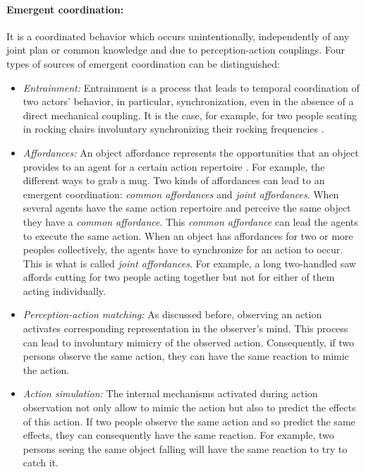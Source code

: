 \documentclass[english,a4paper,11pt,twoside]{StyleThese}
\begin{document}
\paragraph{Emergent coordination:}
It is a coordinated behavior which occurs unintentionally, independently of any joint plan or common knowledge and due to perception-action couplings. Four types of sources of emergent coordination can be distinguished:
\begin{itemize}
\item \textit{Entrainment:} Entrainment is a process that leads to temporal coordination of two actors’ behavior, in particular, synchronization, even in the absence of a direct mechanical coupling. It is the case, for example, for two people seating in rocking chairs involuntary synchronizing their rocking frequencies \cite{richardson2007rocking}.
\item \textit{Affordances:} An object affordance represents the opportunities that an object provides to an agent for a certain action repertoire \cite{gibson2014theory}.
 For example, the different ways to grab a mug. Two kinds of affordances can lead to an emergent coordination: \textit{common affordances} and \textit{joint affordances}. When several agents have the same action repertoire and perceive the same object they have a \textit{common affordance}. This \textit{common affordance} can lead the agents to execute the same action. When an object has affordances for two or more peoples collectively, the agents have to synchronize for an action to occur. This is what is called \textit{joint affordances}. For example, a long two-handled saw affords cutting for two people acting together but not for either of them acting individually.
\item \textit{Perception-action matching:} As discussed before, observing an action activates corresponding representation in the observer's mind. This process can lead to involuntary mimicry of the observed action. Consequently, if two persons observe the same action, they can have the same reaction to mimic the action.
\item \textit{Action simulation:} The internal mechanisms activated during action observation not only allow to mimic the action but also to predict the effects of this action. If two people observe the same action and so predict the same effects, they can consequently have the same reaction. For example, two persons seeing the same object falling will have the same reaction to try to catch it.
\end{itemize}
\end{document}
